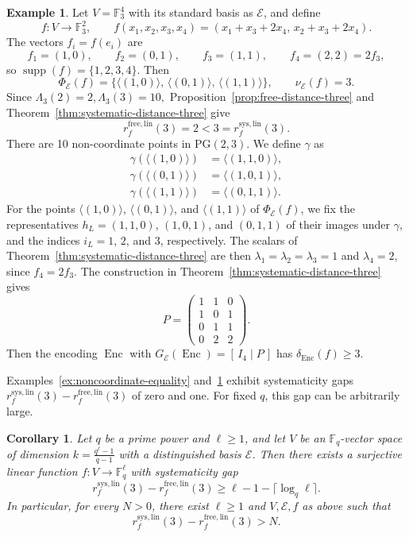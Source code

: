 \documentclass[a4paper,12pt]{article}
\theoremstyle{plain}
\newtheorem{corollary}[lemma]{Corollary}
\theoremstyle{definition}
\newtheorem{example}[lemma]{Example}
\newcommand{\F}{\mathbb F}
\newcommand{\Enc}{\operatorname{Enc}}
\begin{document}
\begin{example}
\label{ex:strict-systematicity-gap}
Let $V=\F_3^4$ with its standard basis as $\mathcal E$, and define
\[
f\colon V\longrightarrow\F_3^2,
\qquad
f(x_1,x_2,x_3,x_4)
=
(x_1+x_3+2x_4,\,x_2+x_3+2x_4).
\]
The vectors $f_i=f(e_i)$ are
\[
f_1=(1,0),\qquad
f_2=(0,1),\qquad
f_3=(1,1),\qquad
f_4=(2,2)=2f_3,
\]
so $\operatorname{supp}(f)=\{1,2,3,4\}$. Then
\[
\Phi_{\mathcal E}(f)
=
\bigl\{
\langle(1,0)\rangle,\,
\langle(0,1)\rangle,\,
\langle(1,1)\rangle
\bigr\},
\qquad
\nu_{\mathcal E}(f)=3.
\]
Since $ \Lambda_3(2)=2,   \Lambda_3(3)=10, $
Proposition~\ref{prop:free-distance-three} and
Theorem~\ref{thm:systematic-distance-three} give
\[
r_f^{\mathrm{free,lin}}(3)=2
<
3=r_f^{\mathrm{sys,lin}}(3).
\]
There are 10 non-coordinate points in $\mathrm{PG}(2,3)$. We define $\gamma$ as
\[
\begin{aligned}
\gamma(\langle(1,0)\rangle)&=\langle(1,1,0)\rangle,\\
\gamma(\langle(0,1)\rangle)&=\langle(1,0,1)\rangle,\\
\gamma(\langle(1,1)\rangle)&=\langle(0,1,1)\rangle.
\end{aligned}
\]
For the points $\langle(1,0)\rangle$, $\langle(0,1)\rangle$, and
$\langle(1,1)\rangle$ of $\Phi_{\mathcal E}(f)$, we fix the
representatives $h_L=(1,1,0)$, $(1,0,1)$, and $(0,1,1)$ of their
images under $\gamma$, and the indices $i_L=1$, $2$, and $3$,
respectively. The scalars of Theorem~\ref{thm:systematic-distance-three}
are then $\lambda_1=\lambda_2=\lambda_3=1$ and $\lambda_4=2$, since
$f_4=2f_3$.
The construction in
Theorem~\ref{thm:systematic-distance-three} gives
\[
P=
\begin{pmatrix}
1&1&0\\
1&0&1\\
0&1&1\\
0&2&2
\end{pmatrix}.
\]
Then the
encoding $\Enc$ with $G_{\mathcal E}(\Enc)=[\,I_4\mid P\,]$ has $\delta_{\Enc}(f)\geq3$. 
\end{example}

Examples~\ref{ex:noncoordinate-equality}
and~\ref{ex:strict-systematicity-gap} exhibit systematicity gaps
$r_f^{\mathrm{sys,lin}}(3)-r_f^{\mathrm{free,lin}}(3)$ of zero and one. 
For fixed $q$, this gap can be arbitrarily large.
\begin{corollary} 
\label{cor:unbounded-systematicity-gap}
Let $q$ be a prime power and $\ell\geq1$, and let $V$ be an $\F_q$-vector space of dimension $k=\frac{q^\ell-1}{q-1}$ with a
distinguished basis $\mathcal E$. Then there exists a surjective
linear function $f\colon V\to\F_q^\ell$ with systematicity gap
\[
r_f^{\mathrm{sys,lin}}(3)-r_f^{\mathrm{free,lin}}(3)
\geq
\ell-1-\lceil\log_q\ell\rceil.
\]
In particular, for every $N>0$, there exist $\ell \ge1$  and $V, \mathcal{E},f$ as above such that
\[
r_f^{\mathrm{sys,lin}}(3)-r_f^{\mathrm{free,lin}}(3)>N.
\]
\end{corollary}
\end{document}
